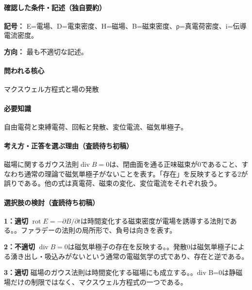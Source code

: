\paragraph{確認した条件・記述（独自要約）}\mbox{}\par

\noindent\textbf{記号：} E=電場、D=電束密度、H=磁場、B=磁束密度、ρ=真電荷密度、i=伝導電流密度。\par

\noindent\textbf{方向：} 最も不適切な記述。\par

\paragraph{問われる核心} マクスウェル方程式と場の発散

\paragraph{必要知識} 自由電荷と束縛電荷、回転と発散、変位電流、磁気単極子。

\paragraph{考え方・正答を選ぶ理由（査読待ち初稿）} 磁場に関するガウス法則\(\operatorname{div}B=0\)は、閉曲面を通る正味磁束が0であること、すなわち通常の理論で磁気単極子がないことを表す。「存在」を反映するとする2が誤りである。他の式は真電荷、磁束の変化、変位電流をそれぞれ扱う。

\paragraph{選択肢の検討（査読待ち初稿）}\mbox{}\par

\noindent\textbf{1：適切} \(\operatorname{rot}E=-\partial B/\partial t\)は時間変化する磁束密度が電場を誘導する法則である。。ファラデーの法則の局所形で、負号は向きを表す。\par

\noindent\textbf{2：不適切} \(\operatorname{div}B=0\)は磁気単極子の存在を反映する。。発散0は磁気単極子による湧き出し・吸込みがないという通常の電磁気学の式であり、存在と逆である。\par

\noindent\textbf{3：適切} 磁場のガウス法則は時間変化する磁場にも成立する。。div B=\allowbreak{}0は静磁場だけの制限ではなく、マクスウェル方程式の一つである。\par

